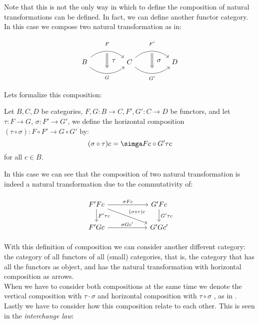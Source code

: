 Note that this is not the only way in which to define the composition of natural transformations can be defined. In fact, we can define another functor category. In this case we compose two natural transformation as in:

\[
  \begin{tikzcd}[column sep=huge]
    B
    \arrow[bend left=40]{r}[name=F,label=above:$\scriptstyle F$]{}
    \arrow[bend right=40]{r}[name=G,label=below:$\scriptstyle G$]{} &
    C
    \arrow[bend left=40]{r}[name=F',label=above:$\scriptstyle F'$]{}
    \arrow[bend right=40]{r}[name=G',label=below:$\scriptstyle G'$]{}&
    D
    \arrow[shorten <=3pt,shorten >=3pt,Rightarrow,to path={(F) -- node[label=right:$\tau$] {} (G)}]{}
    \arrow[shorten <=3pt,shorten >=3pt,Rightarrow,to path={(F') -- node[label=right:$\sigma$] {} (G')}]{}
  \end{tikzcd}
\]

Lets formalize this composition:
\begin{definition}\label{horizontal-composition}
  Let $B,C,D$ be categories, $F,G: B \to C, F',G':C\to D$ be functors, and let $\tau: F \to G$, $\sigma:F'\to G'$, we define the horizontal composition $(\tau \circ \sigma): F\circ F' \to G\circ G'$ by: $$(\sigma \circ \tau) c = \simga F c \circ G' \tau c$$  for all $c\in B$.
\end{definition}

In this case we can see that the composition of two natural transformation is indeed a natural transformation due to the commutativity of:

\[
  \begin{tikzpicture}
    \node {\begin{tikzcd}[column sep=20mm]
        F'Fc      \ar[r,"\sigma F c"]
        \ar[d,"F'\tau c"]
        \ar[dr,"(\sigma\circ \tau)c"]
        & G'Fc\ar[d,"G'\tau c"]\\
        F'Gc\ar[r,"\sigma Gc'"] & G'Gc'
      \end{tikzcd}};
  \end{tikzpicture}
\]


With this definition of composition we can consider another different category: the category of all functors of all (small) categories, that is, the category that has all the functors as object, and has the natural transformation with horizontal composition as arrows.\\

When we have to consider both compositions at the same time we denote the vertical composition with $\tau \cdot \sigma$ and horizontal composition with $\tau \circ \sigma$ , as in  \cite{mac2013categories}. Lastly we have to consider how this composition relate to each other. This is seen in the \emph{interchange law}:\\

